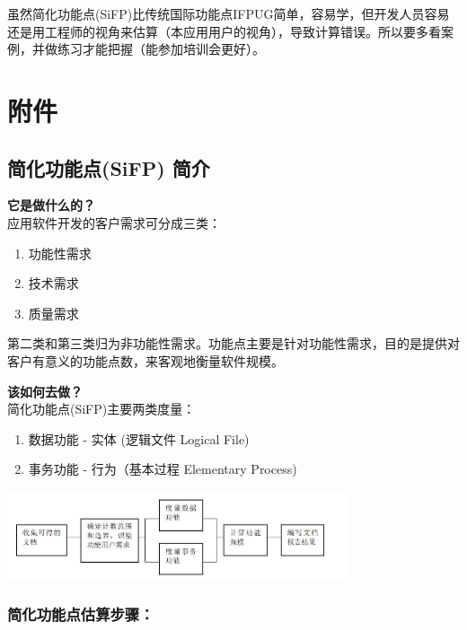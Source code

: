 虽然简化功能点(SiFP)比传统国际功能点IFPUG简单，容易学，但开发人员容易还是用工程师的视角来估算（本应用用户的视角），导致计算错误。所以要多看案例，并做练习才能把握（能参加培训会更好）。

\hypertarget{ux9644ux4ef6}{%
\section{附件}\label{ux9644ux4ef6}}

\hypertarget{ux7b80ux5316ux529fux80fdux70b9sifp-ux7b80ux4ecb}{%
\subsection{简化功能点(SiFP)
简介}\label{ux7b80ux5316ux529fux80fdux70b9sifp-ux7b80ux4ecb}}

 \textbf{它是做什么的？} \\
应用软件开发的客户需求可分成三类：

\begin{enumerate}
\tightlist
\item
  功能性需求
\item
  技术需求
\item
  质量需求
\end{enumerate}

第二类和第三类归为非功能性需求。功能点主要是针对功能性需求，目的是提供对客户有意义的功能点数，来客观地衡量软件规模。

 \textbf{该如何去做？} \\
简化功能点(SiFP)主要两类度量：

\begin{enumerate}
\tightlist
\item
  数据功能 - 实体 (逻辑文件 Logical File)
\item
  事务功能 - 行为（基本过程 Elementary Process)
\end{enumerate}


\includegraphics[width=10cm]{功能点计数过程.jpg}

\hypertarget{ux7b80ux5316ux529fux80fdux70b9ux4f30ux7b97ux6b65ux9aa4}{%
\subsubsection{简化功能点估算步骤：}\label{ux7b80ux5316ux529fux80fdux70b9ux4f30ux7b97ux6b65ux9aa4}}

